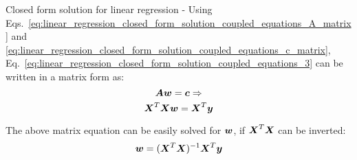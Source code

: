 \begin{frame}[t,allowframebreaks]{Closed form solution for linear regression -}
    Using Eqs.~\ref{eq:linear_regression_closed_form_solution_coupled_equations_A_matrix} and
    \ref{eq:linear_regression_closed_form_solution_coupled_equations_c_matrix},
    Eq.~\ref{eq:linear_regression_closed_form_solution_coupled_equations_3}
    can be written in a matrix form as:
    \begin{equation}
        \boldsymbol{A}\boldsymbol{w} = \boldsymbol{c} \Rightarrow
        \label{eq:linear_regression_closed_form_solution_coupled_equations_matrix_1}
    \end{equation}        
    \begin{equation}
        \boldsymbol{X}^{T} \boldsymbol{X} \boldsymbol{w} = \boldsymbol{X}^{T} \boldsymbol{y}
        \label{eq:linear_regression_closed_form_solution_coupled_equations_matrix_2}
    \end{equation}        

    The above matrix equation can be easily solved for $\boldsymbol{w}$,
    if $\boldsymbol{X}^{T} \boldsymbol{X}$ can be inverted:\\
    \begin{equation}
        \boldsymbol{w} = (\boldsymbol{X}^T \boldsymbol{X})^{-1} \boldsymbol{X}^T \boldsymbol{y}
        \label{eq:linear_regression_closed_form_solution_matrix}
    \end{equation}        

\end{frame}

